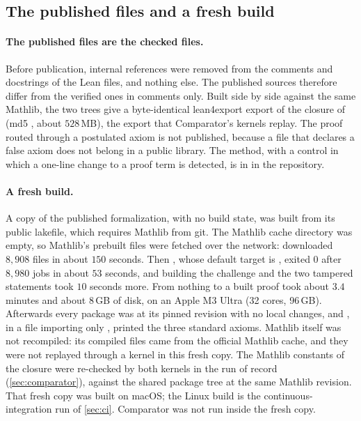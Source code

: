 \documentclass[11pt]{article}
\theoremstyle{definition}
\begin{document}
\subsection{The published files and a fresh build}\label{sec:freshbuild}

\paragraph{The published files are the checked files.} Before publication, internal references were removed from the comments and docstrings of the Lean files, and nothing else. The published sources therefore differ from the verified ones in comments only. Built side by side against the same Mathlib, the two trees give a byte-identical lean4export export of the closure of  (md5 , about $528$\,MB), the export that Comparator's kernels replay. The proof routed through a postulated axiom is not published, because a file that declares a false axiom does not belong in a public library. The method, with a control in which a one-line change to a proof term is detected, is in  in the repository.

\paragraph{A fresh build.} A copy of the published formalization, with no build state, was built from its public lakefile, which requires Mathlib  from git. The Mathlib cache directory was empty, so Mathlib's prebuilt  files were fetched over the network:  downloaded $8{,}908$ files in about $150$ seconds. Then , whose default target is , exited $0$ after $8{,}980$ jobs in about $53$ seconds, and building the challenge and the two tampered statements took $10$ seconds more. From nothing to a built proof took about $3.4$ minutes and about $8$\,GB of disk, on an Apple M3 Ultra (32 cores, 96\,GB). Afterwards every package was at its pinned revision with no local changes, and , in a file importing only , printed the three standard axioms. Mathlib itself was not recompiled: its compiled files came from the official Mathlib cache, and they were not replayed through a kernel in this fresh copy. The Mathlib constants of the closure were re-checked by both kernels in the run of record (\cref{sec:comparator}), against the shared package tree at the same Mathlib revision. That fresh copy was built on macOS; the Linux build is the continuous-integration run of \cref{sec:ci}. Comparator was not run inside the fresh copy.
\end{document}
